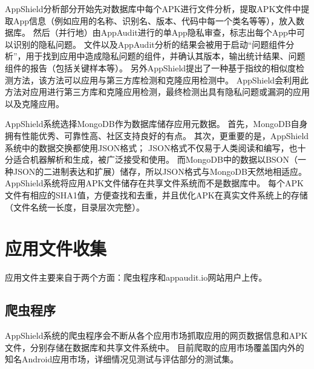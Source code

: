 AppShield分析部分开始先对数据库中每个APK进行文件分析，提取APK文件中提取App信息（例如应用的名称、识别名、版本、代码中每一个类名等等），放入数据库。
然后（并行地）由AppAudit进行的单App隐私审查，标志出每个App中可以识别的隐私问题。
文件以及AppAudit分析的结果会被用于启动“问题组件分析”，用于找到应用中造成隐私问题的组件，并确认其版本，输出统计结果、问题组件的报告（包括关键样本等）。
另外AppShield提出了一种基于指纹的相似度检测方法，该方法可以应用与第三方库检测和克隆应用检测中。
AppShield会利用此方法对应用进行第三方库和克隆应用检测，最终检测出具有隐私问题或漏洞的应用以及克隆应用。

AppShield系统选择MongoDB作为数据库储存应用元数据。
首先，MongoDB自身拥有性能优秀、可靠性高、社区支持良好的有点。
其次，更重要的是，AppShield系统中的数据交换都使用JSON格式；
JSON格式不仅易于人类阅读和编写，也十分适合机器解析和生成，被广泛接受和使用。
而MongoDB中的数据以BSON（一种JSON的二进制表达和扩展）储存，所以JSON格式与MongoDB天然地相适应。
AppShield系统将应用APK文件储存在共享文件系统而不是数据库中。
每个APK文件有相应的SHA1值，方便查找和去重，并且优化APK在真实文件系统上的存储（文件名统一长度，目录层次完整）。

\section{应用文件收集}
\label{sec:appshield:collection}

应用文件主要来自于两个方面：爬虫程序和appaudit.io网站用户上传。

\subsection{爬虫程序}

AppShield系统的爬虫程序会不断从各个应用市场抓取应用的网页数据信息和APK文件，分别存储在数据库和共享文件系统中。
目前爬取的应用市场覆盖国内外的知名Android应用市场，详细情况见测试与评估部分的测试集。

